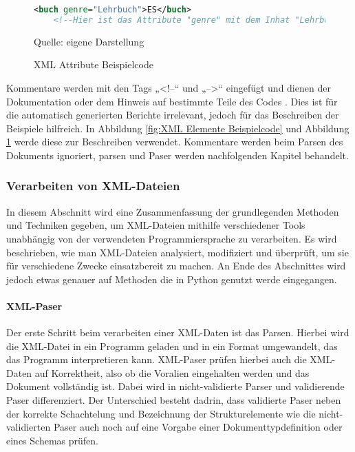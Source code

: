 \begin{figure}[H]
\centering
\begin{minipage}{0.95\textwidth}
\begin{lstlisting}[language=XML]
<buch genre="Lehrbuch">ES</buch>
    <!--Hier ist das Attribute "genre" mit dem Inhat "Lehrbuch"-->
\end{lstlisting}
\end{minipage}
\caption{XML Attribute Beispielcode}
\label{fig:XML Attribute Beispielcode}
    {Quelle: eigene Darstellung}
\end{figure}


Kommentare werden mit den Tags „<!--“ und „-->“ eingefügt und dienen der Dokumentation oder dem Hinweis auf bestimmte Teile des Codes \cite*[10-14]{Becher2022}.
Dies ist für die automatisch generierten Berichte irrelevant, jedoch für das Beschreiben der Beispiele hilfreich.
In Abbildung \ref{fig:XML Elemente Beispielcode} und Abbildung \ref{fig:XML Attribute Beispielcode} werde diese zur Beschreiben verwendet.
Kommentare werden beim Parsen des Dokuments ignoriert, parsen und Paser werden nachfolgenden Kapitel behandelt.
\subsubsection{Verarbeiten von XML-Dateien}
In diesem Abschnitt wird eine Zusammenfassung der grundlegenden Methoden und Techniken gegeben,
um \ac{XML}-Dateien mithilfe verschiedener Tools unabhängig von der verwendeten Programmiersprache zu verarbeiten.
Es wird beschrieben, wie man \ac{XML}-Dateien analysiert, modifiziert und überprüft, um sie für verschiedene Zwecke einsatzbereit zu machen.
An Ende des Abschnittes wird jedoch etwas genauer auf Methoden die in Python genutzt werde eingegangen.

\paragraph{XML-Paser}

Der erste Schritt beim verarbeiten einer \ac{XML}-Daten ist das Parsen.
Hierbei wird die \ac{XML}-Datei in ein Programm geladen und in ein Format umgewandelt, das das Programm interpretieren kann.
XML-Paser prüfen hierbei auch die \ac{XML}-Daten auf Korrektheit, also ob die Voralien eingehalten werden und das Dokument vollständig ist.
Dabei wird in nicht-validierte Parser und validierende Paser differenziert.
Der Unterschied besteht dadrin, dass validierte Paser neben der  korrekte Schachtelung und Bezeichnung der Strukturelemente
wie die nicht-validierten Paser auch noch auf eine Vorgabe einer Dokumenttypdefinition oder eines Schemas prüfen.\cite*[10]{Becher2022}

